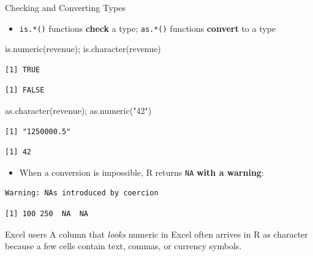 \documentclass[
  ignorenonframetext,
  aspectratio=169,
]{beamer}
\newenvironment{Shaded}{\begin{snugshade}}{\end{snugshade}}
\newcommand{\FunctionTok}[1]{\textcolor[rgb]{0.28,0.35,0.67}{#1}}
\newcommand{\NormalTok}[1]{\textcolor[rgb]{0.00,0.23,0.31}{#1}}
\newcommand{\StringTok}[1]{\textcolor[rgb]{0.13,0.47,0.30}{#1}}
\providecommand{\tightlist}{%
  \setlength{\itemsep}{0pt}\setlength{\parskip}{0pt}}\usepackage{longtable,booktabs,array}
\begin{document}
\begin{frame}[fragile]{Checking and Converting Types}
\protect\hypertarget{sec-convert}{}
\begin{itemize}
\tightlist
\item
  \texttt{is.*()} functions \textbf{check} a type; \texttt{as.*()}
  functions \textbf{convert} to a type
\end{itemize}

\begin{Shaded}
\begin{Highlighting}[]
\FunctionTok{is.numeric}\NormalTok{(revenue); }\FunctionTok{is.character}\NormalTok{(revenue)}
\end{Highlighting}
\end{Shaded}

\begin{verbatim}
[1] TRUE
\end{verbatim}

\begin{verbatim}
[1] FALSE
\end{verbatim}

\begin{Shaded}
\begin{Highlighting}[]
\FunctionTok{as.character}\NormalTok{(revenue); }\FunctionTok{as.numeric}\NormalTok{(}\StringTok{"42"}\NormalTok{)}
\end{Highlighting}
\end{Shaded}

\begin{verbatim}
[1] "1250000.5"
\end{verbatim}

\begin{verbatim}
[1] 42
\end{verbatim}

\begin{itemize}
\tightlist
\item
  When a conversion is impossible, R returns \texttt{NA} \textbf{with a
  warning}:
\end{itemize}

\begin{Shaded}
\end{Shaded}

\begin{verbatim}
Warning: NAs introduced by coercion
\end{verbatim}

\begin{verbatim}
[1] 100 250  NA  NA
\end{verbatim}

\begin{exampleblock}{Excel users}
\protect\hypertarget{excel-users}{}
A column that \emph{looks} numeric in Excel often arrives in R as
character because a few cells contain text, commas, or currency symbols.
\end{exampleblock}
\end{frame}
\end{document}
